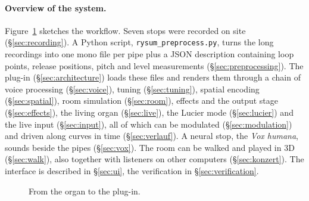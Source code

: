 \documentclass[11pt,a4paper,parskip=half,DIV=11,toc=bibliography]{scrartcl}
\newcommand{\ui}[1]{\emph{#1}}                 %
\newcommand{\fn}[1]{\mbox{\texttt{#1}}}
\begin{document}
\paragraph{Overview of the system.}
Figure~\ref{fig:overview} sketches the workflow. Seven stops were recorded on site
(\S\ref{sec:recording}). A Python script, \fn{rysum\_preprocess.py}, turns the long recordings into
one mono file per pipe plus a JSON description containing loop points, release positions, pitch and
level measurements (\S\ref{sec:preprocessing}). The plug-in (\S\ref{sec:architecture}) loads these files
and renders them through a chain of voice processing (\S\ref{sec:voice}), tuning
(\S\ref{sec:tuning}), spatial encoding (\S\ref{sec:spatial}), room simulation
(\S\ref{sec:room}), effects and the output stage (\S\ref{sec:effects}), the living organ (\S\ref{sec:live}), the Lucier mode (\S\ref{sec:lucier}) and the live input (\S\ref{sec:input}), all of which can be modulated
(\S\ref{sec:modulation}) and driven along curves in time (\S\ref{sec:verlauf}). A neural stop, the \ui{Vox humana}, sounds beside the pipes
(\S\ref{sec:vox}). The room can be walked and played in 3D (\S\ref{sec:walk}), also together with listeners on other computers
(\S\ref{sec:konzert}). The interface is described in \S\ref{sec:ui}, the verification in
\S\ref{sec:verification}.

\begin{figure}[h]
\centering
{}
\caption{From the organ to the plug-in.}
\label{fig:overview}
\end{figure}
\end{document}
